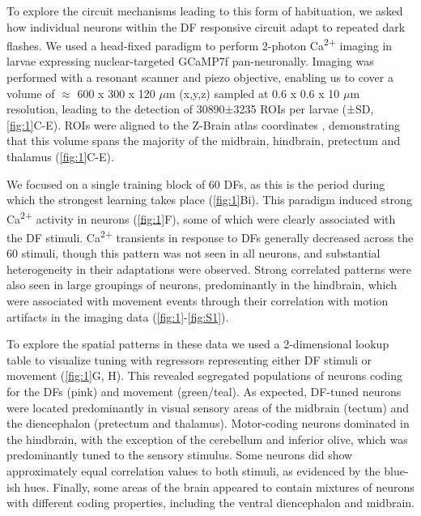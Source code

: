 \documentclass[9pt,lineno]{RandlettLab_elife}
\begin{document}
To explore the circuit mechanisms leading to this form of habituation, we asked how individual neurons within the DF responsive circuit adapt to repeated dark flashes. We used a head-fixed paradigm to perform 2-photon Ca\textsuperscript{2+} imaging in larvae expressing nuclear-targeted GCaMP7f pan-neuronally. Imaging was performed with a resonant scanner and piezo objective, enabling us to cover a volume of $\approx$ 600 x 300 x 120 $\mu$m (x,y,z) sampled at 0.6 x 0.6 x 10 $\mu$m resolution, leading to the detection of 30890±3235 ROIs per larvae (±SD, \autoref{fig:1}C-E). ROIs were aligned to the Z-Brain atlas coordinates \citep{Randlett2015-hy}, demonstrating that this volume spans the majority of the midbrain, hindbrain, pretectum and thalamus (\autoref{fig:1}C-E). 

We focused on a single training block of 60 DFs, as this is the period during which the strongest learning takes place (\autoref{fig:1}Bi). This paradigm induced strong Ca\textsuperscript{2+} activity in neurons (\autoref{fig:1}F), some of which were clearly associated with the DF stimuli. Ca\textsuperscript{2+} transients in response to DFs generally decreased across the 60 stimuli, though this pattern was not seen in all neurons, and substantial heterogeneity in their adaptations were observed. Strong correlated patterns were also seen in large groupings of neurons, predominantly in the hindbrain, which were associated with movement events through their correlation with motion artifacts in the imaging data (\autoref{fig:1}-\autoref{fig:S1}). 

To explore the spatial patterns in these data we used a 2-dimensional lookup table to visualize tuning with regressors representing either DF stimuli or movement (\autoref{fig:1}G, H). This revealed segregated populations of neurons coding for the DFs (pink) and movement (green/teal). As expected, DF-tuned neurons were located predominantly in visual sensory areas of the midbrain (tectum) and the diencephalon (pretectum and thalamus). Motor-coding neurons dominated in the hindbrain, with the exception of the cerebellum and inferior olive, which was predominantly tuned to the sensory stimulus. Some neurons did show approximately equal correlation values to both stimuli, as evidenced by the blue-ish hues. Finally, some areas of the brain appeared to contain mixtures of neurons with different coding properties, including the ventral diencephalon and midbrain. 
\end{document}

